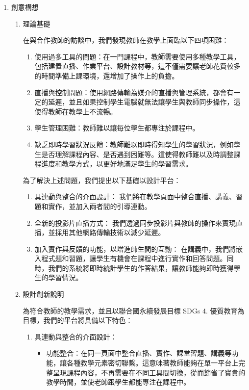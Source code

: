 \documentclass[12pt]{article}
\begin{document}
\begin{enumerate}
    \item 創意構想
    \begin{enumerate}
      \setlength{\parindent}{2em}
      \item 理論基礎
        \par 在與合作教師的訪談中，我們發現教師在教學上面臨以下四項困難：
        \begin{enumerate}[label=(\arabic*)]
          \item 使用過多工具的問題：在一門課程中，教師需要使用多種教學工具，包括建置直播、作業平台、設計教材等，這不僅需要讓老師花費較多的時間準備上課環境，還增加了操作上的負擔。
          \item 直播與控制問題：使用網路傳輸為媒介的直播與管理系統，都會有一定的延遲，並且如果控制學生電腦就無法讓學生與教師同步操作，這使得教師在教學上不流暢。
          \item 學生管理困難：教師難以讓每位學生都專注於課程中。
          \item 缺乏即時學習狀況反饋：教師難以即時得知學生的學習狀況，例如學生是否理解課程內容、是否遇到困難等。這使得教師難以及時調整課程進度和教學方式，以更好地滿足學生的學習需求。
        \end{enumerate}
        \par 為了解決上述問題，我們提出以下基礎以設計平台：
        \begin{enumerate}[label=(\arabic*)]
          \item 具連動與整合的介面設計：
          我們將在教學頁面中整合直播、講義、習題和實作，並加入兩者間的引導連動。
          \item 全新的投影片直播方式：
          我們透過同步投影片與教師的操作來實現直播，並採用其他網路傳輸技術以減少延遲。
          \item 加入實作與反饋的功能，以增進師生間的互動：
          在講義中，我們將嵌入程式題和習題，讓學生有機會在課程中進行實作和回答問題。同時，我們的系統將即時統計學生的作答結果，讓教師能夠即時獲得學生的學習情況。
        \end{enumerate}
      \item 設計創新說明
        \par 為符合教師的教學需求，並且以聯合國永續發展目標 SDGs 4. 優質教育為目標，我們的平台將具備以下特色：
        \begin{enumerate}[label=(\arabic*)]
          \item 具連動與整合的介面設計：
          \begin{itemize}
            \item 功能整合：在同一頁面中整合直播、實作、課堂習題、講義等功能，讓各種教學元素密切聯繫。這意味著教師能夠在單一平台上完整呈現課程內容，不再需要在不同工具間切換，從而節省了寶貴的教學時間，並使老師跟學生都能專注在課程中。

\end{itemize}
\end{enumerate}
\end{enumerate}
\end{enumerate}
\end{document}
